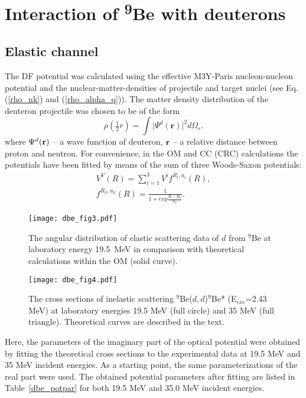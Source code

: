 \documentclass[
12pt, %
oneside, %
english, %
onehalfspacing, %
onehalfspacing, %
headsepline, %
]{MastersDoctoralThesis} %
\newcommand{\be}{\textsuperscript{9}Be\xspace}
\begin{document}
\chapter{Interaction of \be with deuterons }
\section{Elastic channel}
The DF potential was calculated using the effective M3Y-Paris nucleon-nucleon potential \citep{anantaraman1983effective} and the nuclear-matter-densities of projectile and target nuclei (see Eq. (\ref{rho_nk}) and (\ref{rho_alpha_q})). 
The matter density distribution of the deuteron projectile was chosen to be of the form
\begin{equation}
\rho\left( \tfrac{1}{2}r \right) =\int \vert \Psi^d (\textbf{r}) \vert ^2 d \Omega_r.
\end{equation}
where $\Psi^d({\bf r})$ -- a wave function of deuteron, ${\bf r}$ -- a relative distance between proton and neutron. 
For convenience, in the OM and CC (CRC) calculations the potentials have been fitted by means of the sum of three Woods-Saxon potentials:
\begin{eqnarray}
V^V(R) =  \sum_{i=1}^{3} V^i f^{R_i, a_i}(R), \\
 f^{R_V,a_V}(R)=\frac{1}{1+exp{\frac{R-R_V}{a_V}}}.
\end{eqnarray}
\begin{figure}[bp]
\centering
\texttt{[image: dbe\_fig3.pdf]}
\decoRule
\caption{ \label{dbe_fig3} \footnotesize The angular distribution of elastic scattering data of $d$ from ${}^9$Be at laboratory energy 19.5~MeV in comparison with theoretical calculations within the OM (solid curve). }
\end{figure}
\begin{figure}[tp]
\centering
\texttt{[image: dbe\_fig4.pdf]}
\decoRule
\caption{\label{dbe_fig4} \footnotesize The cross sections of inelastic scattering ${}^9$Be($d,d$)$^9$Be* (E$_{exc}$=2.43 MeV) at laboratory energies 19.5 MeV (full circle) and 35 MeV (full triangle). Theoretical curves are described in the text.}
\end{figure} 
Here, the parameters of the imaginary part of the optical potential were obtained by fitting the theoretical cross sections to the experimental data at 19.5 MeV and 35 MeV incident energies. As a starting point, the same parameterizations of the real part were used. The obtained potential parameters after fitting are listed in Table~\ref{dbe_potpar} for both 19.5 MeV and 35.0 MeV incident energies.
\end{document}
